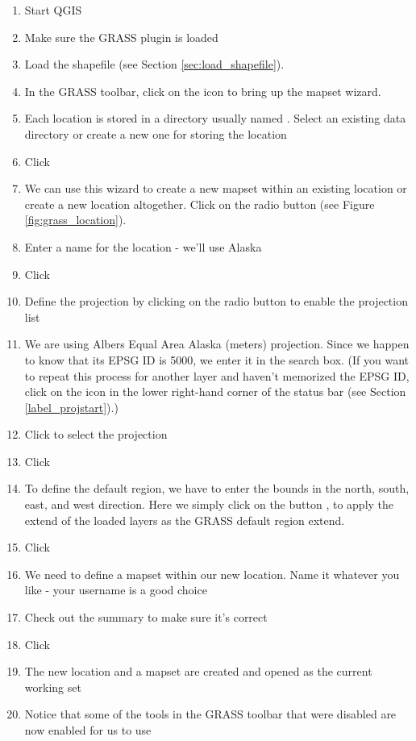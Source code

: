 \begin{enumerate}
  \item Start QGIS
  \item Make sure the GRASS plugin is loaded
  \item Load the  shapefile (see Section \ref{sec:load_shapefile}).
  \item In the GRASS toolbar, click on the  icon to bring up the mapset wizard.
  \item Each location is stored in a directory usually named
  . Select an existing data directory or create a new one
  for storing the location
  \item Click  
  \item We can use this wizard to create a new mapset within an existing 
  location or create a new location altogether. Click on the radio button
   (see Figure \ref{fig:grass_location}).
  \item Enter a name for the location - we'll use Alaska
  \item Click  
  \item Define the projection by clicking on the radio button
   to enable the projection list 
  \item We are using Albers Equal Area Alaska (meters) projection. Since we
  happen to know that its EPSG ID is 5000, we enter it in the search box. (If
  you want to repeat this process for another layer and haven't memorized the
  EPSG ID, click on the  icon
  in the lower right-hand corner of the status bar (see Section
  \ref{label_projstart}).)
  \item Click  to select the projection
  \item Click  
  \item To define the default region, we have to enter the bounds in the
  north, south, east, and west direction. Here we simply click on the button
  , to apply the extend of the loaded layers
  as the GRASS default region extend.
  \item Click  
  \item We need to define a mapset within our new location. Name it whatever 
  you like - your username is a good choice
  \item Check out the summary to make sure it's correct
  \item Click  
  \item The new location  and a mapset are created and
  opened as the current working set
  \item Notice that some of the tools in the GRASS toolbar that were 
  disabled are now enabled for us to use
\end{enumerate}

